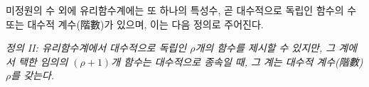 
미정원의 수 외에 유리함수계에는 또 하나의 특성수, 곧 대수적으로 독립인 함수의 수 또는 대수적 계수(階數)가 있으며, 이는 다음 정의로 주어진다.

\emph{정의 II: 유리함수계에서 대수적으로 독립인 $\rho$개의 함수를 제시할 수 있지만, 그 계에서 택한 임의의 $(\rho+1)$개 함수는 대수적으로 종속일 때, 그 계는 대수적 계수(階數) $\rho$를 갖는다.}
